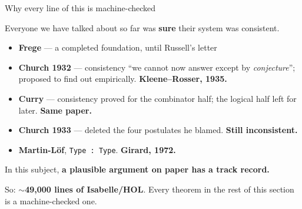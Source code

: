 \documentclass[aspectratio=169,11pt]{beamer}
\newcommand{\key}[1]{{\color{accent}\textbf{#1}}}
\newcommand{\bad}[1]{{\color{warn}\textbf{#1}}}
\begin{document}
\begin{frame}{Why every line of this is machine-checked}
  \vfill
  \begin{center}\large
    Everyone we have talked about so far was \key{sure} their system was consistent.
  \end{center}
  \vfill
  \small
  \begin{itemize}\itemsep0.3em
    \item \textbf{Frege} --- a completed foundation, until Russell's letter
    \item \textbf{Church 1932} --- consistency ``we cannot now answer except by
          \emph{conjecture}''; proposed to find out empirically. \bad{Kleene--Rosser, 1935.}
    \item \textbf{Curry} --- consistency proved for the combinator half; the logical
          half left for later. \bad{Same paper.}
    \item \textbf{Church 1933} --- deleted the four postulates he blamed. \bad{Still inconsistent.}
    \item \textbf{Martin-L\"of}, \texttt{Type : Type}. \bad{Girard, 1972.}
  \end{itemize}
  \normalsize
  \vfill
  \pause
  \begin{center}\Large
    In this subject, \key{a plausible argument on paper has a track record.}
  \end{center}
  \vfill
  \begin{center}\small
    So: \key{$\sim$49{,}000 lines of Isabelle/HOL}. Every theorem in the rest of
    this section is a machine-checked one.
  \end{center}
\end{frame}
\end{document}
